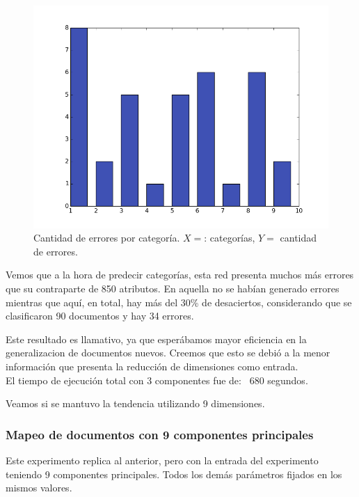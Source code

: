 \begin{figure}[!htbp]
  \begin{center}
    \includegraphics[scale=0.5]{../img/validation_1000ep_3en_sigma7_faseord750.png}
  \caption{Cantidad de errores por categoría. $X=$: categorías, $Y=$ cantidad de errores.}
  \end{center}
\end{figure}

Vemos que a la hora de predecir categorías, esta red presenta muchos más errores que su contraparte de 850 atributos. En aquella no se habían generado errores mientras que aquí, en total, hay más del 30\% de desaciertos, considerando que se clasificaron 90 documentos y hay 34 errores. 

Este resultado es llamativo, ya que esperábamos mayor eficiencia en la generalizacion de documentos nuevos. Creemos que esto se debió a la menor información que presenta la reducción de dimensiones como entrada.\\

El tiempo de ejecución total con 3 componentes fue de: ~680 segundos.

Veamos si se mantuvo la tendencia utilizando 9 dimensiones.

\subsubsection{Mapeo de documentos con 9 componentes principales}

Este experimento replica al anterior, pero con la entrada del experimento teniendo 9 componentes principales. Todos los demás parámetros fijados en los mismos valores.

